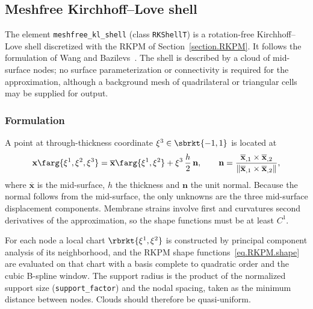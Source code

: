 
\subsection{Meshfree Kirchhoff--Love shell}
\label{section.meshfree.shell}
The element \texttt{meshfree\_kl\_shell} (class \texttt{RKShellT}) is a rotation-free
Kirchhoff--Love shell discretized with the RKPM of Section~\ref{section.RKPM}. It follows the
formulation of Wang and Bazilevs~\cite{WangBazilevs2025}. The shell is described by a cloud of
mid-surface nodes; no surface parameterization or connectivity is required for the approximation,
although a background mesh of quadrilateral or triangular cells may be supplied for output.

\subsubsection{Formulation}
A point at through-thickness coordinate $\xi^{3}\in\sbrkt{-1,1}$ is located at
\begin{equation}
\label{eq.KLshell.kinematics}
\mathbf{x}\farg{\xi^{1},\xi^{2},\xi^{3}} =
   \overline{\mathbf{x}}\farg{\xi^{1},\xi^{2}} + \xi^{3}\,\frac{h}{2}\,\mathbf{n},
\qquad
\mathbf{n} = \frac{\overline{\mathbf{x}}_{,1}\times\overline{\mathbf{x}}_{,2}}
             {\left\|\overline{\mathbf{x}}_{,1}\times\overline{\mathbf{x}}_{,2}\right\|},
\end{equation}
where $\overline{\mathbf{x}}$ is the mid-surface, $h$ the thickness and $\mathbf{n}$ the unit normal.
Because the normal follows from the mid-surface, the only unknowns are the three mid-surface
displacement components. Membrane strains involve first and curvatures second derivatives of the
approximation, so the shape functions must be at least $C^{1}$.

For each node a local chart $\rbrkt{\xi^{1},\xi^{2}}$ is constructed by principal component
analysis of its neighborhood, and the RKPM shape functions~\eqref{eq.RKPM.shape} are evaluated on
that chart with a basis complete to quadratic order and the cubic B-spline window. The support
radius is the product of the normalized support size (\texttt{support\_factor}) and the nodal
spacing, taken as the minimum distance between nodes. Clouds should therefore be quasi-uniform.

